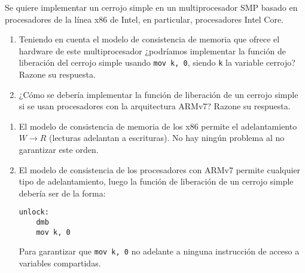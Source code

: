 \begin{ejercicio}
    Se quiere implementar un cerrojo simple en un multiprocesador SMP basado en procesadores de la línea x86 de Intel, en particular, procesadores Intel Core. 
    \begin{enumerate}
        \item Teniendo en cuenta el modelo de consistencia de memoria que ofrece el hardware de este multiprocesador ¿podríamos implementar la función de liberación del cerrojo simple usando \verb|mov k, 0|, siendo \verb|k| la variable cerrojo? Razone su respuesta.
        \item ¿Cómo se debería implementar la función de liberación de un cerrojo simple si se usan procesadores con la arquitectura ARMv7? Razone su respuesta.
    \end{enumerate}

    \begin{enumerate}
        \item El modelo de consistencia de memoria de los x86 permite el adelantamiento $W\rightarrow R$ (lecturas adelantan a escrituras). No hay ningún problema al no garantizar este orden.
        \item El modelo de consistencia de los procesadores con ARMv7 permite cualquier tipo de adelantamiento, luego la función de liberación de un cerrojo simple debería ser de la forma:
            \begin{listing}[H]
            \begin{verbatim}
unlock:
    dmb
    mov k, 0
            \end{verbatim}
            \end{listing}
        Para garantizar que \verb|mov k, 0| no adelante a ninguna instrucción de acceso a variables compartidas.
    \end{enumerate}
\end{ejercicio}

